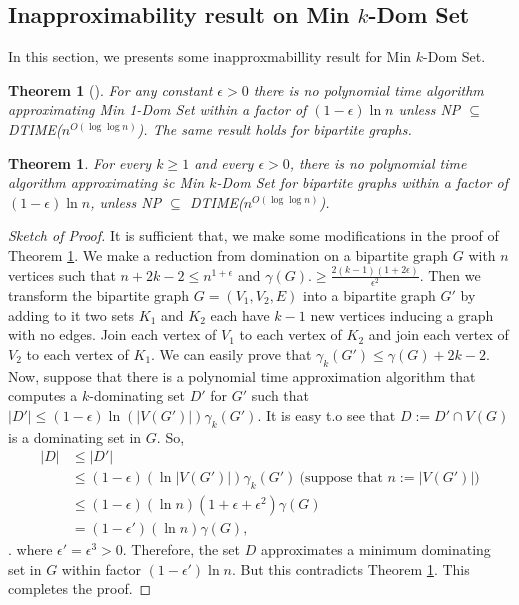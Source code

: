 \documentclass[a0,portrait]{a0poster}
\theoremstyle{definition}
\theoremstyle{plain}
\newtheorem{theorem}[definition]{Theorem}
\theoremstyle{definition}
\begin{document}
\begin{multicols}{2}
\section{Inapproximability result on {\sc Min} $k$-{\sc Dom Set} }
In this section, we presents some inapproxmabillity result for {\sc Min} $k$-{\sc Dom Set}. 
\begin{theorem}[\cite{chlebik2008approximation}]
\label{thmepdom}
For any constant $\epsilon>0$ there is no polynomial time algorithm approximating {\sc Min 1-Dom Set} within a factor of $(1-\epsilon)\ln n$ unless NP $\subseteq$ DTIME($n^{O(\log \log n)}$). The same result {holds} for  bipartite graphs.
\end{theorem}
\begin{theorem}
For every $k \geq 1$ and every $\epsilon >0$, there is no polynomial time algorithm approximating {\.sc Min} $k$-{\sc Dom Set} for bipartite graphs within a factor of $(1-\epsilon) \ln n$, unless NP $\subseteq$ DTIME($n^{O(\log \log n)}$).
\end{theorem}
\begin{proof}[Sketch of Proof]
It is {sufficient} that, we make some modifications in the proof of Theorem \ref{thmepdom}. We make a reduction from domination on a bipartite graph $G$ with $n$ vertices such that $n+2k-2 \leq n^{1+\epsilon}$
and $\gamma(G).\geq \frac{2(k-1)(1+2\epsilon)}{\epsilon^2}.$ Then we transform the bipartite graph $G=(V_1,V_2, E)$ into a  bipartite graph $G'$ by adding to it two sets $K_1$ and $K_2$ each have $k-1$ new vertices inducing a graph {with} no edges.  Join each vertex of $V_1$ to each vertex of $K_2$ and join each vertex of $V_2$ to each vertex of $K_1$. We can easily prove that $\gamma_k(G')\leq \gamma(G)+2k-2$.
 Now,  suppose that there is a polynomial time approximation algorithm that computes a $k$-dominating set $D'$ for $G'$ such that  $|D'|\leq (1-\epsilon)\ln(|V(G')|)\gamma_k(G')$. It is easy t.o see that  $D:=D'\cap V(G)$ is a dominating set in  $G$. So, 
\begin{align*}
|D|&\leq|D'|\\
&\leq(1-\epsilon)(\ln |V(G')|) \gamma_{k}(G')~\mbox{(suppose that  $n:=|V(G')|$})\\
&\leq(1-\epsilon)(\ln n)  ({1+\epsilon+\epsilon^2})\gamma(G)\\
&=(1-\epsilon')(\ln n)\gamma(G),
\end{align*}.
where $\epsilon'=\epsilon^3>0.$  Therefore, the set $D$ approximates a minimum dominating set in  $G$  within factor $(1-\epsilon')\ln n$. But this contradicts Theorem \ref{thmepdom}. This completes the proof.
\end{proof}

\end{multicols}
\end{document}
